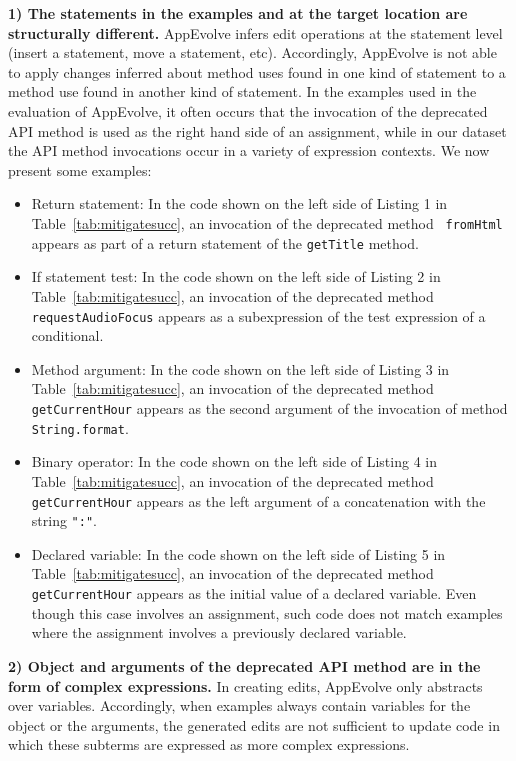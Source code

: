 \vspace{0.25\baselineskip}\noindent\textbf{1) The statements in the examples and at the target location are
 structurally different.} AppEvolve infers edit operations at the statement
 level (insert a statement, move a statement, etc).  Accordingly, AppEvolve
 is not able to apply changes inferred about method uses found in one kind
 of statement to a method use found in another kind of statement.  In the
 examples used in the evaluation of AppEvolve, it often occurs that the
 invocation of the deprecated API method is used as the right hand side of
 an assignment, while in our dataset the API method invocations occur in a
 variety of expression contexts.  We now present some examples:
\begin{itemize}
\item Return statement:
In the code shown on the left side of Listing 1 in
Table~\ref{tab:mitigatesucc}, an invocation of the deprecated method {\tt
fromHtml} appears as part of a return statement of the {\tt getTitle}
method.

\item If statement test:
In the code shown on the left side of Listing 2 in
Table~\ref{tab:mitigatesucc}, an invocation of the deprecated method {\tt
requestAudioFocus} appears as a subexpression of the test expression of a
conditional.

\item Method argument:
In the code shown on the left side of Listing 3 in
Table~\ref{tab:mitigatesucc}, an invocation of the deprecated method {\tt
getCurrentHour} appears as the second argument of the invocation of method {\tt
String.format}.

\item Binary operator:
In the code shown on the left side of Listing 4 in
Table~\ref{tab:mitigatesucc}, an invocation of the deprecated method {\tt
getCurrentHour} appears as the left argument of a concatenation with the
string {\tt ":"}.

\item Declared variable:
In the code shown on the left side of Listing 5 in
Table~\ref{tab:mitigatesucc}, an invocation of the deprecated method {\tt
getCurrentHour} appears as the initial value of a declared variable.  Even
though this case involves an assignment, such code does not match examples where
the assignment involves a previously declared variable.
\end{itemize}

\vspace{0.25\baselineskip}\noindent\textbf{2) Object and arguments of the
deprecated API method are in the form of complex expressions.}
In creating edits, AppEvolve only abstracts over variables.  Accordingly,
when examples always contain variables for the object or the arguments, the
generated edits are not sufficient to update code in which these subterms
are expressed as more complex expressions.

